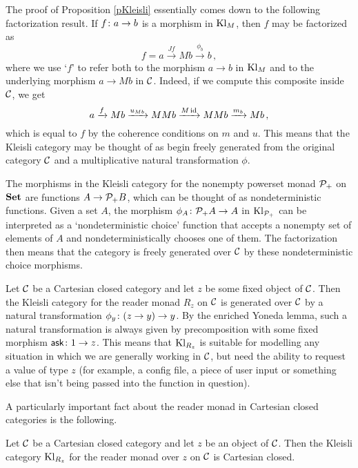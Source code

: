 \documentclass{article}
\begin{document}
The proof of Proposition \ref{pKleisli} essentially comes down to the following factorization result.  
If $f\colon a \to b$ is a morphism in $\operatorname{Kl}_M$, then $f$ may be factorized as
\[
  f = a \xrightarrow{Jf}
  Mb \xrightarrow{\phi_b}
  b\,,
  \]
where we use `$f$' to refer both to the morphism $a\to b$ in $\operatorname{Kl}_M$ and to the underlying morphism $a \to Mb$ in ${\mathcal{C}}$.
Indeed, if we compute this composite inside ${\mathcal{C}}$, we get
\[
  a \xrightarrow{f}
  Mb \xrightarrow{u_{Mb}}
  MMb \xrightarrow{M\operatorname{id}}
  MMb \xrightarrow{m_b}
  Mb\,,
  \]
which is equal to $f$ by the coherence conditions on $m$ and $u$.
This means that the Kleisli category may be thought of as begin freely generated from the original category ${\mathcal{C}}$ and a multiplicative natural transformation $\phi$.

\begin{example}
  The morphisms in the Kleisli category for the nonempty powerset monad $\mathcal P_+$ on ${\normalfont\textbf{Set}}$ are functions $A \to \mathcal P_+B$, which can be thought of as nondeterministic functions.  
  Given a set $A$, the morphism $\phi_A\colon \mathcal P_+A \to A$ in $\operatorname{Kl}_{\mathcal P_+}$ can be interpreted as a `nondeterministic choice' function that accepts a nonempty set of elements of $A$ and nondeterministically chooses one of them.
  The factorization then means that the category is freely generated over ${\mathcal{C}}$ by these nondeterministic choice morphisms.
\end{example}
\begin{example}
  Let ${\mathcal{C}}$ be a Cartesian closed category and let $z$ be some fixed object of ${\mathcal{C}}$.  
  Then the Kleisli category for the reader monad $R_z$ on ${\mathcal{C}}$ is generated over ${\mathcal{C}}$ by a natural transformation $\phi_y\colon (z \to y) \to y$.  
  By the enriched Yoneda lemma, such a natural transformation is always given by precomposition with some fixed morphism ${\mathsf{ask}}\colon 1 \to z$.  
  This means that $\operatorname{Kl}_{R_z}$ is suitable for modelling any situation in which we are generally working in ${\mathcal{C}}$, but need the ability to request a value of type $z$ (for example, a config file, a piece of user input or something else that isn't being passed into the function in question).
  \label{ExReaderMonadKleisli}
\end{example}

A particularly important fact about the reader monad in Cartesian closed categories is the following.

\begin{theorem}
  Let ${\mathcal{C}}$ be a Cartesian closed category and let $z$ be an object of ${\mathcal{C}}$.  
  Then the Kleisli category $\operatorname{Kl}_{R_z}$ for the reader monad over $z$ on ${\mathcal{C}}$ is Cartesian closed.
  \label{FunctionalCompletenessCcc}
\end{theorem}
\end{document}
